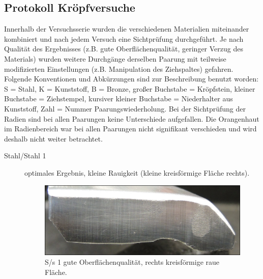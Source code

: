 \documentclass[12pt,a4paper,parskip,twoside,BCOR5mm,headsepline]{scrartcl}
\begin{document}
\begin{description*}
\subsection{Protokoll Kröpfversuche}
Innerhalb der Versuchsserie wurden die verschiedenen Materialien miteinander kombiniert und nach jedem Versuch eine Sichtprüfung durchgeführt. Je nach Qualität des Ergebnisses (z.B. gute Oberflächenqualität, geringer Verzug des Materials) wurden weitere Durchgänge derselben Paarung mit teilweise modifizierten Einstellungen (z.B. Manipulation des Ziehspaltes) gefahren. Folgende Konventionen und Abkürzungen sind zur Beschreibung benutzt worden: S = Stahl, K = Kunststoff, B = Bronze, großer Buchstabe = Kröpfstein, kleiner Buchstabe = Ziehstempel, kursiver kleiner Buchstabe = Niederhalter aus Kunststoff, Zahl = Nummer Paarungswiederholung. Bei der Sichtprüfung der Radien sind bei allen Paarungen keine Unterschiede aufgefallen. Die Orangenhaut im Radienbereich war bei allen Paarungen nicht signifikant verschieden und wird deshalb nicht weiter betrachtet.

\begin{description}
\item[Stahl/Stahl 1] optimales Ergebnis, kleine Rauigkeit (kleine kreisförmige Fläche rechts).
\begin{figure}[H]
\centering
\includegraphics[width=.8\textwidth]{Ss1a}
\caption{S/s 1 gute Oberflächenqualität, rechts kreisförmige raue Fläche.}
\label{fig:ss1a}
\end{figure}


\end{description}
\end{description*}
\end{document}
